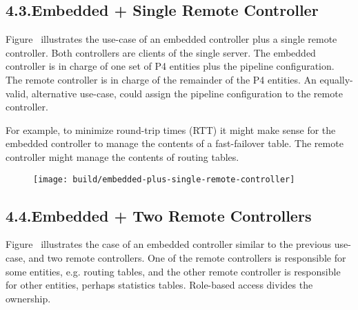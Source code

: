 \documentclass[11pt]{article}
\begin{document}
{%
\subsection{4.3.\hspace*{0.5em}Embedded + Single Remote Controller}\label{sec-embedded-single-remote-controller}%

\noindent{}Figure~ illustrates the use-case of
an embedded controller plus a single remote controller. Both controllers are
clients of the single server. The embedded controller is in charge of one set of
P4 entities plus the pipeline configuration. The remote controller is in charge
of the remainder of the P4 entities. An equally-valid, alternative use-case,
could assign the pipeline configuration to the remote controller.%

For example, to minimize round-trip times (RTT) it might make sense for the
embedded controller to manage the contents of a fast-failover table. The remote
controller might manage the contents of routing tables.%

\begin{figure}[tbp]%
\begin{mdcenter}%

\noindent{}\texttt{[image: build/embedded-plus-single-remote-controller]}{}%

\mdhr{}%

\noindent{}%
\end{mdcenter}\label{fig-embedded-plus-single-remote-controller}%
\end{figure}%

\subsection{4.4.\hspace*{0.5em}Embedded + Two Remote Controllers}\label{sec-embedded-two-remote-controllers}%

\noindent{}Figure~ illustrates the case of an
embedded controller similar to the previous use-case, and two remote
controllers. One of the remote controllers is responsible for some entities,
e.g. routing tables, and the other remote controller is responsible for other
entities, perhaps statistics tables. Role-based access divides the ownership.%

}
\end{document}
